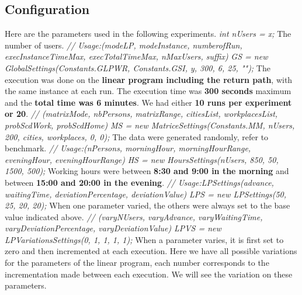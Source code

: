 \documentclass[12pt, a4paper, twoside]{memoir}
\newcommand{\newpar}{\vskip 0.2in \noindent}
\newcommand\tab[1][1cm]{\hspace*{#1}}
\begin{document}
{	\subsection{Configuration}
	Here are the parameters used in the following experiments.
	\newpar
	\tab \textit{int nUsers = x;}\newline
	The number of users.
	\newpar
	\tab \textit{// Usage:(modeLP, modeInstance, numberofRun, execInstanceTimeMax, execTotalTimeMax, nMaxUsers, suffix)}\newline
	\tab \textit{GS = new GlobalSettings(Constants.GLPWR, Constants.GSI, y, 300, 6, 25, "");}\newline
	The execution was done on the \textbf{linear program including the return path}, with the same instance at each run. The execution time was \textbf{300 seconds} maximum and the \textbf{total time was 6 minutes}. We had either \textbf{10 runs per experiment or 20}.
	\newpar
	\tab \textit{// (matrixMode, nbPersons, matrixRange, citiesList, workplacesList, probScdWork, probScdHome)}\newline
	\tab \textit{MS = new MatriceSettings(Constants.MM, nUsers, 200, cities, workplaces, 0, 0);}\newline
	The data were generated randomly, refer to benchmark. 
	\newpar
	\tab \textit{// Usage:(nPersons, morningHour, morningHourRange, eveningHour, eveningHourRange)}\newline
	\tab \textit{HS = new HoursSettings(nUsers, 850, 50, 1500, 500);}\newline
	Working hours were between \textbf{8:30 and 9:00 in the morning} and between \textbf{15:00 and 20:00 in the evening}.
	\newpar
	\tab \textit{// Usage:LPSettings(advance, waitingTime, deviationPercentage, deviationValue)}\newline
	\tab \textit{LPS = new LPSettings(50, 25, 20, 20);}\newline
	When one parameter varied, the others were always set to the base value indicated above. 
	\newpar
	\tab \textit{// (varyNUsers, varyAdvance, varyWaitingTime, varyDeviationPercentage, varyDeviationValue)}\newline
	\tab \textit{LPVS = new LPVariationsSettings(0, 1, 1, 1, 1);}\newline
	When a parameter varies, it is first set to zero and then incremented at each execution. Here we have all possible variations for the parameters of the linear program, each number corresponds to the incrementation made between each execution. We will see the variation on these parameters.

}
\end{document}
